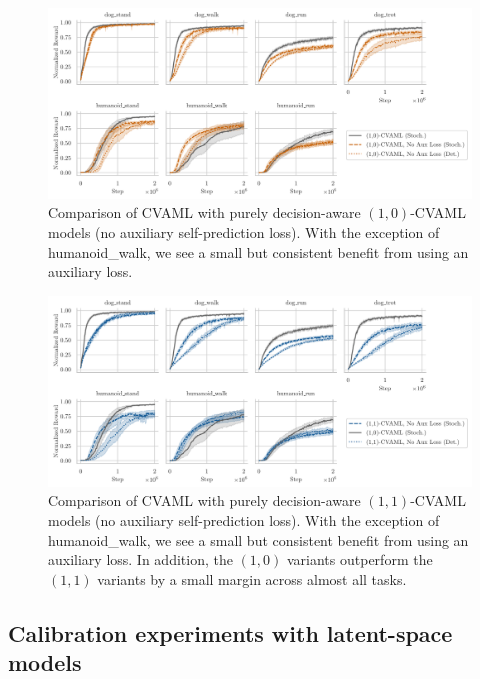 \begin{figure}[t]
\centering
    \includegraphics[width=\textwidth]{figures/lambda/plts/ablated_reward2.pdf}
    \caption{Comparison of CVAML with purely decision-aware $(1,0)$-CVAML models (no auxiliary self-prediction loss). With the exception of humanoid\_walk, we see a small but consistent benefit from using an auxiliary loss.}
   \label{fig:cvaml:ablation_itervaml}
\end{figure}


\begin{figure}[t]
\centering
    \includegraphics[width=\textwidth]{figures/lambda/plts/ablated_reward3.pdf}
    \caption{Comparison of CVAML with purely decision-aware $(1,1)$-CVAML models (no auxiliary self-prediction loss). With the exception of humanoid\_walk, we see a small but consistent benefit from using an auxiliary loss. In addition, the $(1,0)$ variants outperform the $(1,1)$ variants by a small margin across almost all tasks.}
   \label{fig:cvaml:ablation_muzero}
\end{figure}

\subsection{Calibration experiments with latent-space models}
\label{sec:cvaml:empirical2}

